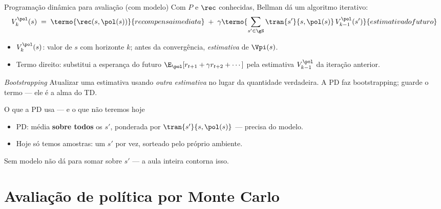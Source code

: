 \documentclass[aspectratio=169, 11pt]{beamer}
\begin{document}
\begin{frame}{Programação dinâmica para avaliação (com modelo)}
  Com $P$ e $\rec$ conhecidas, Bellman dá um algoritmo iterativo:
  \[
    V^{\pol}_{k}(s) \;=\; \termo{\rec(s,\pol(s))}{recompensa imediata}
      \;+\; \gamma \termo{\sum_{s' \in \gS} \tran{s'}{s,\pol(s)}\, V^{\pol}_{k-1}(s')}{estimativa do futuro}
  \]

  \begin{itemize}
    \item $V^{\pol}_k(s)$: valor de $s$ com horizonte $k$; antes da
      convergência, \emph{estimativa} de $\Vpi(s)$.
    \item Termo direito: substitui a esperança do futuro
      $\E_{\pol}[r_{t+1} + \gamma r_{t+2} + \cdots]$ pela estimativa
      $V^{\pol}_{k-1}$ da iteração anterior.
  \end{itemize}

  \begin{defbox}{\emph{Bootstrapping}}
    Atualizar uma estimativa usando \emph{outra estimativa} no lugar da
    quantidade verdadeira. A PD faz bootstrapping; guarde o termo — ele
    é a alma do TD.
  \end{defbox}
\end{frame}

\begin{frame}{O que a PD usa — e o que não teremos hoje}
  \centering
  \backupdiagrama

  \medskip
  \begin{itemize}
    \item PD: média \textbf{sobre todos} os $s'$, ponderada por
      $\tran{s'}{s,\pol(s)}$ — precisa do modelo.
    \item Hoje só temos \alert{amostras}: um $s'$ por vez, sorteado pelo
      próprio ambiente.
  \end{itemize}

  \begin{alertabox}
    Sem modelo não dá para somar sobre $s'$ — a aula inteira contorna isso.
  \end{alertabox}
\end{frame}

\section{Avaliação de política por Monte Carlo}
\end{document}
